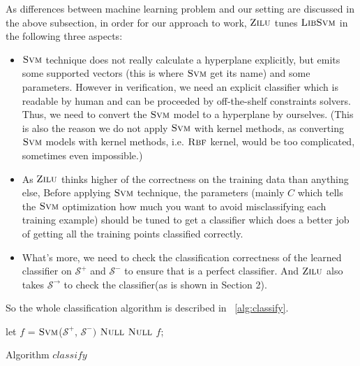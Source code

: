 As differences between machine learning problem and our setting are discussed in the above subsection, in order for our approach to work,
$\textsc{Zilu}$ tunes $\textsc{LibSvm}$ in the following three aspects: 
\begin{itemize}
\item $\textsc{Svm}$ technique does not really calculate a hyperplane explicitly, 
but emits some supported vectors (this is where $\textsc{Svm}$ get its name) and some parameters.
However in verification, we need an explicit classifier which is readable by human and can be proceeded by off-the-shelf constraints solvers.
Thus, we need to convert the $\textsc{Svm}$ model to a hyperplane by ourselves.
(This is also the reason we do not apply $\textsc{Svm}$ with kernel methods,
as converting $\textsc{Svm}$ models with kernel methods, i.e. $\textsc{Rbf}$ kernel, would be too complicated, sometimes even impossible.)
\item As $\textsc{Zilu}$ thinks higher of the correctness on the training data than anything else,
Before applying $\textsc{Svm}$ technique, the parameters (mainly $C$ which tells the $\textsc{Svm}$ optimization how much you want to avoid misclassifying each training example)
should be tuned to get a classifier which does a better job of getting all the training points classified correctly.
\item What's more, we need to check the classification correctness of the learned classifier 
on $\mathcal{S}^+$ and $\mathcal{S}^-$ to ensure that is a perfect classifier.
And $\textsc{Zilu}$ also takes $\mathcal{S}^\rightarrow$ to check the classifier(as is shown in Section 2).
\end{itemize} 

So the whole classification algorithm is described in ~\ref{alg:classify}.

\begin{algorithm}[!h]
\SetAlgoVlined
\Indm
{}
\Indp
    let $f$ = $\textsc{Svm}$($\mathcal{S}^+$, $\mathcal{S}^-)$\;
     {
        \Return $\textsc{Null}$\;
    }
     {
        \Return $\textsc{Null}$\;
    }
    \Return $f$;
\caption{Algorithm $classify$}
\label{alg:classify}
\end{algorithm}

